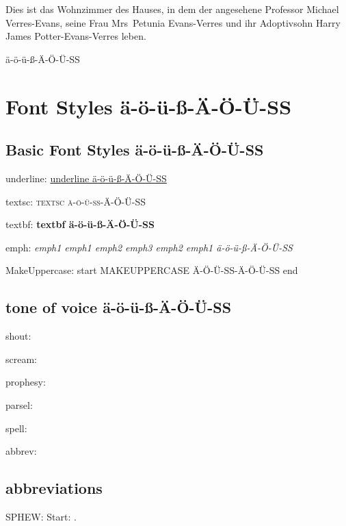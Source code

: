 Dies ist das Wohnzimmer des Hauses, in dem der angesehene Professor Michael Verres-Evans, seine Frau Mrs~Petunia Evans-Verres und ihr Adoptivsohn Harry James Potter-Evans-Verres leben.

ä-ö-ü-ß-Ä-Ö-Ü-SS

\chapter{Font Styles ä-ö-ü-ß-Ä-Ö-Ü-SS}

\section{Basic Font Styles ä-ö-ü-ß-Ä-Ö-Ü-SS}

underline: \underline{underline ä-ö-ü-ß-Ä-Ö-Ü-SS}

textsc: \textsc{textsc ä-ö-ü-ß-Ä-Ö-Ü-SS}

textbf: \textbf{textbf ä-ö-ü-ß-Ä-Ö-Ü-SS}

emph: \emph{emph1 emph1 \emph{emph2 \emph{emph3} emph2} emph1 ä-ö-ü-ß-Ä-Ö-Ü-SS}

MakeUppercase: start \MakeUppercase{MakeUppercase ä-ö-ü-ß-Ä-Ö-Ü-SS} end

\section{tone of voice ä-ö-ü-ß-Ä-Ö-Ü-SS}

shout: 

scream: 

prophesy: 

parsel: 

spell: 

abbrev: 

\section{abbreviations}
SPHEW: Start: \SPHEW.

